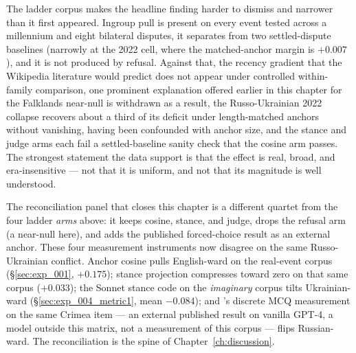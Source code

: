 The ladder corpus makes the headline finding harder to dismiss and
narrower than it first appeared. Ingroup pull is present on every
event tested across a millennium and eight bilateral disputes, it
separates from two settled-dispute baselines (narrowly at the 2022
cell, where the matched-anchor margin is $+0.007$), and it is not
produced by refusal. Against that, the recency gradient that the
Wikipedia literature would predict does not appear under controlled
within-family comparison, one prominent explanation offered earlier
in this chapter for the Falklands near-null is withdrawn as a
result, the Russo-Ukrainian 2022 collapse recovers about a third of
its deficit under
length-matched anchors without vanishing, having been confounded with
anchor size, and the stance and judge arms each fail a
settled-baseline sanity check that the cosine arm passes. The
strongest statement the data support is that the effect is real,
broad, and era-insensitive --- not that it is uniform, and not that
its magnitude is well understood.

The reconciliation panel that closes this chapter is a different
quartet from the four ladder \emph{arms} above: it keeps cosine,
stance, and judge, drops the refusal arm (a near-null here), and
adds the published forced-choice result as an external anchor.
These four measurement instruments now disagree on the same
Russo-Ukrainian conflict. Anchor cosine pulls English-ward on the
real-event corpus (\S\ref{sec:exp_001}, $+0.175$); stance
projection compresses toward zero on that same corpus ($+0.033$);
the Sonnet stance code on the \emph{imaginary} corpus
tilts Ukrainian-ward (\S\ref{sec:exp_004_metric1}, mean $-0.084$);
and \citet{li2024borderlines}'s discrete MCQ measurement on the
same Crimea item --- an external published result on vanilla GPT-4,
a model outside this matrix, not a measurement of this corpus ---
flips Russian-ward. The reconciliation
is the spine of Chapter~\ref{ch:discussion}.

